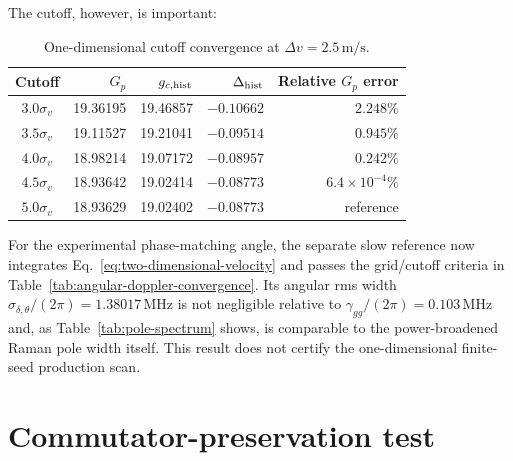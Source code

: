 \documentclass[11pt,a4paper]{article}
\newcommand{\MHz}{\,\mathrm{MHz}}
\begin{document}
The cutoff, however, is important:

\begin{table}[ht]
\centering
\caption{One-dimensional cutoff convergence at
$\Delta v=2.5\,\mathrm{m/s}$.}
\label{tab:velocity-cutoff}
\small
\begin{tabular}{c r r r r}
\toprule
Cutoff & $G_p$ & $g_{c,{\rm hist}}$ & $\Delta_{\rm hist}$ &
Relative $G_p$ error\\
\midrule
$3.0\sigma_v$ & 19.36195 & 19.46857 & $-0.10662$ & $2.248\%$\\
$3.5\sigma_v$ & 19.11527 & 19.21041 & $-0.09514$ & $0.945\%$\\
$4.0\sigma_v$ & 18.98214 & 19.07172 & $-0.08957$ & $0.242\%$\\
$4.5\sigma_v$ & 18.93642 & 19.02414 & $-0.08773$ & $6.4\times10^{-4}\%$\\
$5.0\sigma_v$ & 18.93629 & 19.02402 & $-0.08773$ & reference\\
\bottomrule
\end{tabular}
\end{table}

For the experimental phase-matching angle, the separate slow reference now
integrates Eq.~\eqref{eq:two-dimensional-velocity} and passes the grid/cutoff
criteria in Table~\ref{tab:angular-doppler-convergence}. Its angular rms width
$\sigma_{\delta,\theta}/(2\pi)=1.38017\MHz$ is not negligible relative to
$\gamma_{gg}/(2\pi)=0.103\MHz$ and, as Table~\ref{tab:pole-spectrum} shows,
is comparable to the power-broadened Raman pole width itself. This result does
not certify the one-dimensional finite-seed production scan.

\clearpage
\section{Commutator-preservation test}
\end{document}
